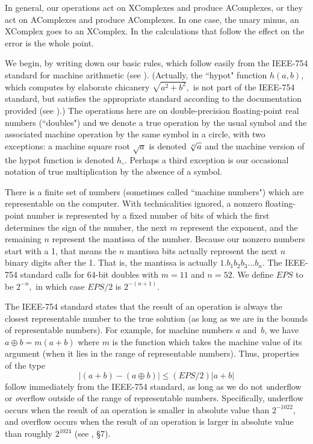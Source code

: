 \begin{remark}\label{GMT 7.3}
In general,  our operations  act on XComplexes and produce AComplexes, or they act on AComplexes and produce
 AComplexes.  In one case, the unary minus, an XComplex goes to an XComplex.  
In the calculations that follow the effect on the error is the whole point.\end{remark}

\begin{conventions} \label{GMT 7.4}
We begin, by writing down our basic rules, which follow easily from the IEEE-754 standard for machine arithmetic (see \cite{IEEE}).
(Actually,  the ``hypot" function $h(a,b)$, which computes by elaborate chicanery $\sqrt{a^2 + b^2},$ is not part of the IEEE-754 standard, but  satisfies the appropriate standard according to the documentation provided (see \cite{K1}).)  The operations here are on
double-precision floating-point real numbers (``doubles") and we denote a true operation by the usual symbol and the associated machine operation by the same symbol in a circle, with two exceptions: a machine square root $\sqrt a$ is denoted $\root o \of a$ and the machine version of the hypot function is denoted $h_\circ$.  Perhaps a third exception is our occasional notation of true multiplication by the absence of a symbol.  

There is a finite set of numbers (sometimes called ``machine numbers") which are representable on the computer.  With
technicalities ignored,    a nonzero floating-point number is represented by a fixed number of bits of which
the first determines the sign of the number, the next $m$ represent the exponent, and the remaining $n$ represent the
mantissa of the number.  Because our nonzero numbers start with a 1, that means the $n$ mantissa bits actually represent
the next
$n$ binary digits after the 1.  That is, the mantissa is actually $1.b_1b_2b_3...b_{n}.$   The IEEE-754 standard calls for
64-bit doubles with $m = 11$ and $n = 52.$  We define $EPS$ to be $2^{-n},$ in which case $EPS/2$ is $2^{-(n + 1)}.$  

The IEEE-754 standard states that the result of an operation
 is always the closest representable number to the true solution (as long as we are in the bounds of representable
numbers).  For example, for machine numbers $a$ and~$b$, we have $a \oplus b = m(a+b)$ where $m$ is the function which
takes the machine value of its argument (when it lies in the range of representable numbers).  Thus, properties of the type
$$|(a + b) - (a \oplus b)| \leq (EPS/2) |a + b|$$
follow immediately from the IEEE-754 standard, as long as we do not {\textit underflow} or {\textit overflow} outside of the range of representable numbers. 
Specifically, underflow occurs when the result of an operation is smaller in absolute value than $2^{-1022}$,
 and overflow occurs when the result of an operation is larger in absolute value than roughly $2^{1024}$
	(see \cite{IEEE}, \S 7).


\end{conventions}
